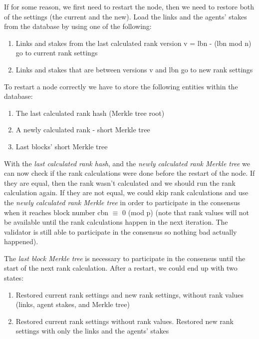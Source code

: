 \documentclass[8pt,oneside]{amsart}
\newcommand{\code}[1]{{\PlayBold #1}}
\begin{document}
\begin{Abstract}
If for some reason, we first need to restart the node, then we need to restore both of the settings (the current and the new).
Load the links and the agents' stakes from the database by using one of the following:

\begin{enumerate}
  \item Links and stakes from the last calculated rank version \code{v = lbn - (lbn mod n)} go to current rank settings
  \item Links and stakes that are between versions \code{v} and \code{lbn} go to new rank settings
\end{enumerate}

To restart a node correctly we have to store the following entities within the database:

\begin{enumerate}
  \item The last calculated rank hash (Merkle tree root)
  \item A newly calculated rank - short Merkle tree
  \item Last blocks' short Merkle tree
\end{enumerate}

With the \textit{last calculated rank hash}, and the \textit{newly calculated rank Merkle tree} we can now check if the rank
calculations were done before the restart of the node. If they are equal, then the rank wasn't calculated and we should run the rank calculation again.
If they are not equal, we could skip rank calculations and use the \textit{newly calculated rank Merkle tree} in order to participate in the consensus when it reaches block number \code{cbn $\equiv$ 0 (mod p)} (note that rank values will not be available until the rank calculations happen in the next iteration. The validator is still able to participate in the consensus so nothing bad actually happened).

The \textit{last block Merkle tree} is necessary to participate in the consensus until the start of the next rank calculation. After a restart, we could end up with two states:

\begin{enumerate}
\item Restored current rank settings and new rank settings, without rank values (links, agent stakes, and Merkle tree)
\item Restored current rank settings without rank values. Restored new rank settings with only the links and the agents' stakes
\end{enumerate}


\end{Abstract}
\end{document}
